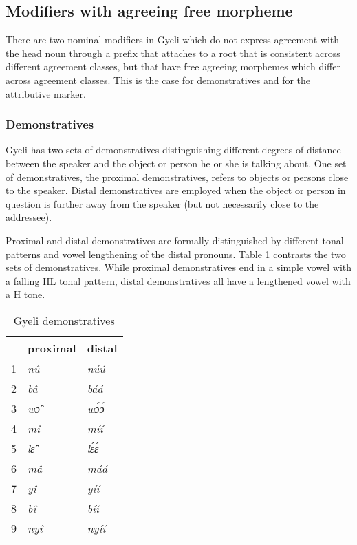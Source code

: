 \subsection{Modifiers with agreeing free morpheme}
\label{sec:MODAgrForm}

There are two nominal modifiers in Gyeli which do not express agreement with the head noun through a prefix that attaches to a root that is consistent across different agreement classes, but that have free agreeing morphemes which differ across agreement classes. This is the case for demonstratives and for the attributive marker.
		
		

\subsubsection{Demonstratives}
\label{sec:DEM}



Gyeli has two sets of demonstratives distinguishing different degrees of distance between the speaker and the object or person he or she is talking about. One set of demonstratives, the proximal demonstratives, refers to objects or persons close to the speaker. Distal demonstratives are employed when the object or person in question is further away from the speaker (but not necessarily close to the addressee). 

Proximal and distal demonstratives are formally distinguished by different tonal patterns and vowel lengthening of the distal pronouns. Table \ref{Tab:dem} contrasts the two sets of demonstratives. While proximal demonstratives end in a simple vowel with a falling HL tonal pattern, distal demonstratives all have a lengthened vowel with a H tone.

\begin{table} 
\centering
\begin{tabular}{r|p{3cm}|p{3cm}}
 \midrule
 & proximal & distal \\
  \midrule
 1 & \itshape{nû} & \itshape{núú} \\
 2 & \itshape{bâ} & \itshape{báá} \\
 3 & \itshape{wɔ̂} & \itshape{wɔ́ɔ́} \\
4 & \itshape{mî} & \itshape{míí} \\
5 & \itshape{lɛ̂} & \itshape{lɛ́ɛ́} \\
6 & \itshape{mâ} & \itshape{máá} \\
7 & \itshape{yî} & \itshape{yíí} \\
8 & \itshape{bî} & \itshape{bíí} \\
9 & \itshape{nyî} & \itshape{nyíí} \\
  \midrule
\end{tabular}
\caption{Gyeli demonstratives}
\label{Tab:dem}
\end{table}

